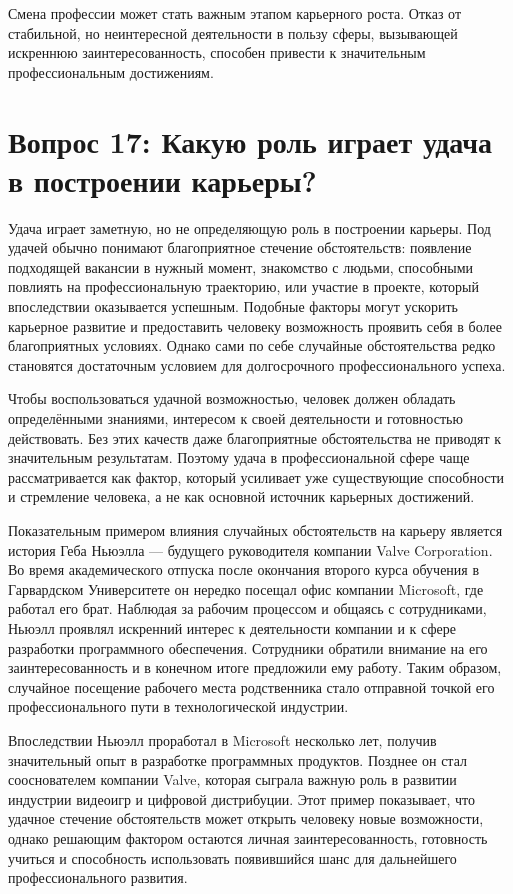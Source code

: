 \documentclass[14pt,a4paper]{extarticle}
\begin{document}
Смена профессии может стать важным этапом карьерного роста. Отказ от стабильной, но неинтересной деятельности в пользу сферы, вызывающей искреннюю заинтересованность, способен привести к значительным профессиональным достижениям.

\newpage
\section{Вопрос 17: Какую роль играет удача в построении карьеры?}

Удача играет заметную, но не определяющую роль в построении карьеры. Под удачей обычно понимают благоприятное стечение обстоятельств: появление подходящей вакансии в нужный момент, знакомство с людьми, способными повлиять на профессиональную траекторию, или участие в проекте, который впоследствии оказывается успешным. Подобные факторы могут ускорить карьерное развитие и предоставить человеку возможность проявить себя в более благоприятных условиях. Однако сами по себе случайные обстоятельства редко становятся достаточным условием для долгосрочного профессионального успеха.

Чтобы воспользоваться удачной возможностью, человек должен обладать определёнными знаниями, интересом к своей деятельности и готовностью действовать. Без этих качеств даже благоприятные обстоятельства не приводят к значительным результатам. Поэтому удача в профессиональной сфере чаще рассматривается как фактор, который усиливает уже существующие способности и стремление человека, а не как основной источник карьерных достижений.

Показательным примером влияния случайных обстоятельств на карьеру является история Геба Ньюэлла — будущего руководителя компании Valve Corporation. Во время академического отпуска после окончания второго курса обучения в Гарвардском Университете он нередко посещал офис компании Microsoft, где работал его брат. Наблюдая за рабочим процессом и общаясь с сотрудниками, Ньюэлл проявлял искренний интерес к деятельности компании и к сфере разработки программного обеспечения. Сотрудники обратили внимание на его заинтересованность и в конечном итоге предложили ему работу. Таким образом, случайное посещение рабочего места родственника стало отправной точкой его профессионального пути в технологической индустрии.

Впоследствии Ньюэлл проработал в Microsoft несколько лет, получив значительный опыт в разработке программных продуктов. Позднее он стал сооснователем компании Valve, которая сыграла важную роль в развитии индустрии видеоигр и цифровой дистрибуции. Этот пример показывает, что удачное стечение обстоятельств может открыть человеку новые возможности, однако решающим фактором остаются личная заинтересованность, готовность учиться и способность использовать появившийся шанс для дальнейшего профессионального развития.
\end{document}
